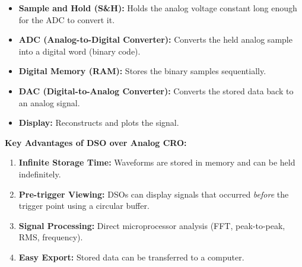 \documentclass[12pt,a4paper]{article}
\begin{document}
\begin{tcolorbox}[tikzbox, title={DSO Digitisation Block Diagram}]
\centering
{}
\end{tcolorbox}

\begin{itemize}[leftmargin=*, itemsep=3pt]
  \item \textbf{Sample and Hold (S\&H):} Holds the analog voltage constant long enough for the ADC to convert it.
  \item \textbf{ADC (Analog-to-Digital Converter):} Converts the held analog sample into a digital word (binary code).
  \item \textbf{Digital Memory (RAM):} Stores the binary samples sequentially.
  \item \textbf{DAC (Digital-to-Analog Converter):} Converts the stored data back to an analog signal.
  \item \textbf{Display:} Reconstructs and plots the signal.
\end{itemize}

\textbf{Key Advantages of DSO over Analog CRO:}
\begin{enumerate}[label=\textbf{\arabic*.}, leftmargin=*, itemsep=2pt]
  \item \textbf{Infinite Storage Time:} Waveforms are stored in memory and can be held indefinitely.
  \item \textbf{Pre-trigger Viewing:} DSOs can display signals that occurred \textit{before} the trigger point using a circular buffer.
  \item \textbf{Signal Processing:} Direct microprocessor analysis (FFT, peak-to-peak, RMS, frequency).
  \item \textbf{Easy Export:} Stored data can be transferred to a computer.
\end{enumerate}
\end{document}
